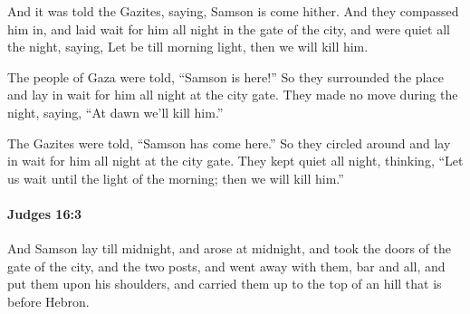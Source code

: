 			\begin{versebox}
					\item[BHS] 
					\item[ASV] And it was told the Gazites, saying, Samson is come hither. And they compassed him in, and laid wait for him all night in the gate of the city, and were quiet all the night, saying, Let be till morning light, then we will kill him.
					\item[NIV] The people of Gaza were told, “Samson is here!” So they surrounded the place and lay in wait for him all night at the city gate. They made no move during the night, saying, “At dawn we’ll kill him.”
					\item[NRSV] The Gazites were told, “Samson has come here.” So they circled around and lay in wait for him all night at the city gate. They kept quiet all night, thinking, “Let us wait until the light of the morning; then we will kill him.”
			\end{versebox}

		\paragraph{Judges 16:3} %
			\label{JUDGES-16-3}

			And Samson lay till midnight, and arose at midnight, and took the doors of the gate of the city, and the two posts, and went away with them, bar and all, and put them upon his shoulders, and carried them up to the top of an hill that is before Hebron.

